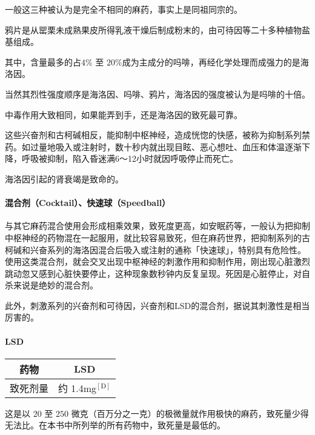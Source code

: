 \documentclass[UTF8]{ctexart}
\begin{document}
一般这三种被认为是完全不相同的麻药，事实上是同祖同宗的。

鸦片是从罂栗未成熟果皮所得乳液干燥后制成粉末的，由可待因等二十多种植物盐基组成。

其中，含量最多的占$4\%$ 至 $20\%$成为主成分的吗啡，再经化学处理而成强力的是海洛因。

当然其烈性强度顺序是海洛因、吗啡、鸦片，海洛因的强度被认为是吗啡的十倍。

中毒作用大致相同，如果能弄到手，还是海洛因的致死最可靠。

这些兴奋剂和古柯碱相反，能抑制中枢神经，造成恍惚的快感，被称为抑制系列禁药。如过量地吸入或注射时，数十秒内就出现目眩、恶心想吐、血压和体温逐渐下降，呼吸被抑制，陷入昏迷满6～12小时就因呼吸停止而死亡。

海洛因引起的肾衰竭是致命的。

\paragraph*{混合剂（Cocktail）、快速球（Speedball）}

与其它麻药混合使用会形成相乘效果，致死度更高，如安眠药等，一般认为把抑制中枢神经的药物混在一起服用，就比较容易致死，但在麻药世界，把抑制系列的古柯碱和兴奋系列的海洛因混合后吸入或注射的通称「快速球」，特别具有危险性。使用这类混合剂，就会交叉出现中枢神经的刺激作用和抑制作用，刚出现心脏激烈跳动忽又感到心脏快要停止，这种现象数秒钟内反复呈现。死因是心脏停止，对自杀来说是绝妙的混合剂。

此外，刺激系列的兴奋剂和可待因，兴奋剂和LSD的混合剂，据说其刺激性是相当厉害的。

\paragraph*{LSD}

\begin{table}[htbp]
\begin{center}
\begin{tabular}{cc}

\toprule
药物 & LSD \\
\midrule
致死剂量 & 约 1.4mg$^\mathrm{[D]}$ \\
\bottomrule
\end{tabular}
\end{center}
\end{table}

这是以 $20$ 至 $250$ 微克（百万分之一克）的极微量就作用极快的麻药，致死量少得无法比。在本书中所列举的所有药物中，致死量是最低的。
\end{document}

